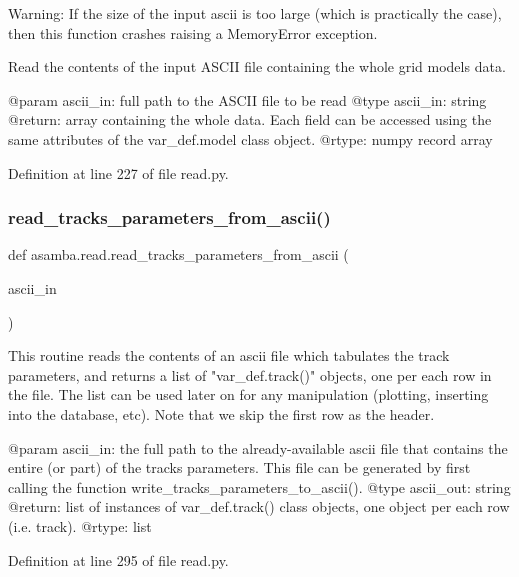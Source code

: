 \begin{DoxyVerb}Warning: If the size of the input ascii is too large (which is practically the case), then this 
function crashes raising a MemoryError exception.

Read the contents of the input ASCII file containing the whole grid models data.

@param ascii_in: full path to the ASCII file to be read
@type ascii_in: string
@return: array containing the whole data. Each field can be accessed using the same attributes of
         the var_def.model class object.
@rtype: numpy record array
\end{DoxyVerb}
 

Definition at line 227 of file read.\+py.

\mbox{\label{namespaceasamba_1_1read_ad29a871a69a759e56c120bfc3d898702}} 
\subsubsection{\texorpdfstring{read\+\_\+tracks\+\_\+parameters\+\_\+from\+\_\+ascii()}{read\_tracks\_parameters\_from\_ascii()}}
{\footnotesize\ttfamily def asamba.\+read.\+read\+\_\+tracks\+\_\+parameters\+\_\+from\+\_\+ascii (\begin{DoxyParamCaption}\item[{}]{ascii\+\_\+in }\end{DoxyParamCaption})}

\begin{DoxyVerb}This routine reads the contents of an ascii file which tabulates the track parameters, and returns
a list of "var_def.track()" objects, one per each row in the file. The list can be used later on
for any manipulation (plotting, inserting into the database, etc). Note that we skip the first row
as the header.

@param ascii_in: the full path to the already-available ascii file that contains the entire (or part)
       of the tracks parameters. This file can be generated by first calling the function  
       write_tracks_parameters_to_ascii().
@type ascii_out: string
@return: list of instances of var_def.track() class objects, one object per each row (i.e. track).
@rtype: list
\end{DoxyVerb}
 

Definition at line 295 of file read.\+py.


